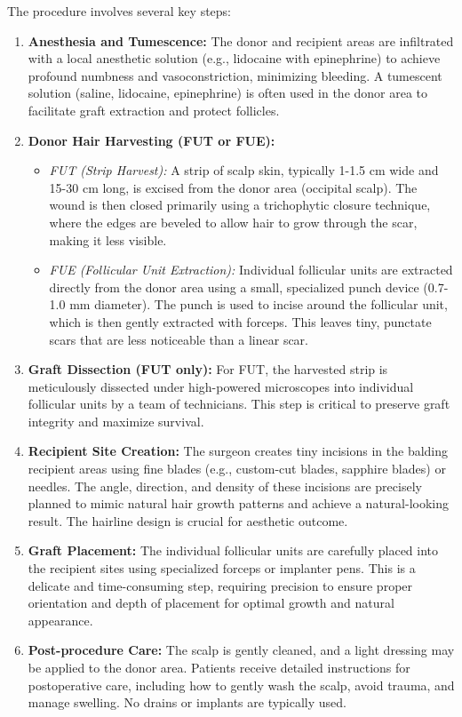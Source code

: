 The procedure involves several key steps:
\begin{enumerate}
  \item \textbf{Anesthesia and Tumescence:} The donor and recipient areas are infiltrated with a local anesthetic solution (e.g., lidocaine with epinephrine) to achieve profound numbness and vasoconstriction, minimizing bleeding. A tumescent solution (saline, lidocaine, epinephrine) is often used in the donor area to facilitate graft extraction and protect follicles.
  \item \textbf{Donor Hair Harvesting (FUT or FUE):}
    \begin{itemize}
      \item \textit{FUT (Strip Harvest):} A strip of scalp skin, typically 1-1.5 cm wide and 15-30 cm long, is excised from the donor area (occipital scalp). The wound is then closed primarily using a trichophytic closure technique, where the edges are beveled to allow hair to grow through the scar, making it less visible.
      \item \textit{FUE (Follicular Unit Extraction):} Individual follicular units are extracted directly from the donor area using a small, specialized punch device (0.7-1.0 mm diameter). The punch is used to incise around the follicular unit, which is then gently extracted with forceps. This leaves tiny, punctate scars that are less noticeable than a linear scar.
    \end{itemize}
  \item \textbf{Graft Dissection (FUT only):} For FUT, the harvested strip is meticulously dissected under high-powered microscopes into individual follicular units by a team of technicians. This step is critical to preserve graft integrity and maximize survival.
  \item \textbf{Recipient Site Creation:} The surgeon creates tiny incisions in the balding recipient areas using fine blades (e.g., custom-cut blades, sapphire blades) or needles. The angle, direction, and density of these incisions are precisely planned to mimic natural hair growth patterns and achieve a natural-looking result. The hairline design is crucial for aesthetic outcome.
  \item \textbf{Graft Placement:} The individual follicular units are carefully placed into the recipient sites using specialized forceps or implanter pens. This is a delicate and time-consuming step, requiring precision to ensure proper orientation and depth of placement for optimal growth and natural appearance.
  \item \textbf{Post-procedure Care:} The scalp is gently cleaned, and a light dressing may be applied to the donor area. Patients receive detailed instructions for postoperative care, including how to gently wash the scalp, avoid trauma, and manage swelling. No drains or implants are typically used.
\end{enumerate}

